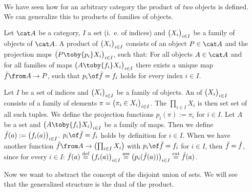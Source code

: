 We have seen how for an arbitrary category the product of \emph{two} objects is defined.
We can generalize this to products of families of objects.

\begin{definition}
  \label{def:arb:prod}
  Let $\catA$ be a category, $I$ a set (i.~e. of indices) and $\bigl( X_i \bigr)_{i \in I}$ be a family of objects of $\catA$.
  A product of $\bigl( X_i \bigr)_{i \in I}$ consists of an object $P \in \catA$ and the projection maps $\family{P \toby{p_i} X_i}{i \in I}$, such that:
  For all objects $A \in \catA$ and for all families of maps $\family{A \toby{f_i} X_i}{i \in I}$ there exists a unique map $\fbar \from A \to P$, such that $p_i \of \fbar = f_i$ holds for every index $i \in I$.
\end{definition}

\begin{example}
  \label{ex:arb:prod:cart}
  Let $I$ be a set of indices and $\bigl( X_i \bigr)_{i \in I}$ be a family of objects.
  An  of $\bigl( X_i \bigr)_{i \in I}$ consists of a family of elements $\pi = \bigl( \pi_i \in X_i \bigr)_{i \in I}$.
  The  $\prod_{i \in I}{X_i}$ is then set set of all such tuples.
  We define the projection functions $p_i(\pi) := \pi_i$ for $i \in I$.
  Let $A$ be a set and $\family{A \toby{f_i} X_i}{i \in I}$ be a family of maps.
  Then we define $\bar{f}(a) := \bigl( f_i(a) \bigr)_{i \in I}$. $p_i \of \fbar = f_i$ holds by definition for $i \in I$.
  When we have another function $\ftilde \from A \to \bigl(\prod_{i \in I}{X_i}\bigr)$ with $p_i \of \ftilde = f_i$ for $i \in I$, then $\bar{f} = \tilde{f}$, since for every $i \in I$:
  $\bar{f}(a) \stackrel{\text{def}}{=} \bigl( f_i(a) \bigr)_{i \in I} \stackrel{\text{ass}}{=} \bigl( p_i(\tilde{f}(a)) \bigr)_{i \in I} \stackrel{\text{ext}}{=} \tilde{f}(a)$.
\end{example}

Now we want to abstract the concept of the disjoint union of sets.
We will see that the generalized structure is the dual of the product.

